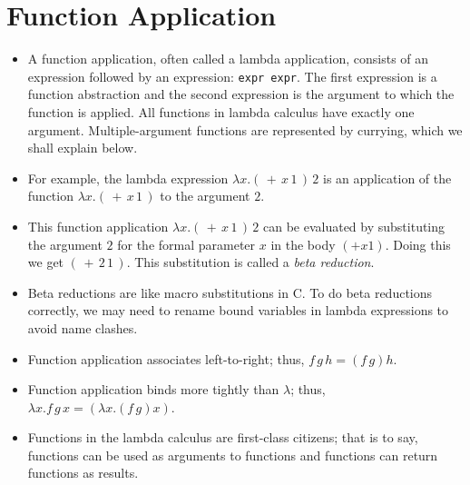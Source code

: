 \documentclass[]{article}
\begin{document}
\section{Function Application}
\begin{itemize}
\item A function application, often called a lambda application, consists of an expression followed by an expression: \texttt{expr expr}. The first expression is a function abstraction and the second expression is the argument to which the function is applied. All functions in lambda calculus have exactly one argument. Multiple-argument functions are represented by currying, which we shall explain below.
\item For example, the lambda expression $\lambda x.(\,+\,x\,1\,)\,2$ is an application of the function $\lambda x.(\,+\,x\,1\,)$ to the argument $2$.
\item This function application $\lambda x.(\,+\,x\,1\,)\,2$ can be evaluated by substituting the argument $2$ for the formal parameter $x$ in the body $(+x1)$. Doing this we get $(\,+\,2\,1\,)$. This substitution is called a \emph{beta reduction}.
\item Beta reductions are like macro substitutions in C. To do beta reductions correctly, we may need to rename bound variables in lambda expressions to avoid name clashes.
\item Function application associates left-to-right; thus, $f\,g\,h=(f\,g)h$.
\item Function application binds more tightly than $\lambda$; thus, $\lambda x.f\,g\,x=(\lambda x.(f\,g)x)$.
\item Functions in the lambda calculus are first-class citizens; that is to say, functions can be used as arguments to functions and functions can return functions as results.
\end{itemize}
\end{document}
